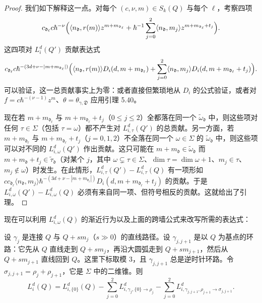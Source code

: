 \begin{proof}
我们如下解释这一点。对每个 $(c,\nu,m)\in S_k(Q)$ 与每个 $\ell$，考察四项
\[
  c_{\mathfrak d_\ell}c\hbar^{-\nu}\Bigl(\langle n_{\mathfrak d},r(m)\rangle z^{m+m_{\mathfrak d_\ell}}
  +\hbar^{-1}\sum_{j=0}^{2}\langle n_{\mathfrak d},m_j\rangle z^{m+m_{\mathfrak d_\ell}+t_j}\Bigr).
\]
这四项对 $L^d_i(Q')$ 贡献表达式
\[
  c_{\mathfrak d_\ell}c\hbar^{-(3d+\nu-|m+m_{\mathfrak d_\ell}|)}
  \Bigl(\langle n_{\mathfrak d},r(m)\rangle D_i(d,m+m_{\mathfrak d_\ell})
  +\sum_{j=0}^{2}\langle n_{\mathfrak d},m_j\rangle D_i(d,m+m_{\mathfrak d_\ell}+t_j)\Bigr).
\]
可以验证，这一总贡献事实上为零：或者直接但繁琐地从 $D_i$ 的公式验证，或者对 $f=c\hbar^{-(\nu-1)}z^m$、$\theta=\theta_{\gamma,\mathfrak D}$ 应用引理 5.40。

现在若 $m+m_{\mathfrak d_\ell}$ 与 $m+m_{\mathfrak d_\ell}+t_j$（$0\le j\le 2$）全都落在同一个 $\tilde\omega_{\mathfrak d}$ 中，则这些项对任何 $\tau\in\Sigma$（包括 $\tau=\omega$）都不产生对 $L^d_{i,\tau}(Q')$ 的总贡献。另一方面，若 $m+m_{\mathfrak d_\ell}$ 与 $m+m_{\mathfrak d_\ell}+t_j$（$j=0,1,2$）不全落在同一个 $\omega\in\Sigma$ 的 $\tilde\omega_{\mathfrak d}$ 中，则这些项可以对不同的 $L^d_{i,\omega}(Q')$ 作出贡献。这只可能在 $m+m_{\mathfrak d}\in\tilde\omega_{\mathfrak d}$ 而 $m+m_{\mathfrak d}+t_j\in\tilde\tau_{\mathfrak d}$（对某个 $j$，其中 $\omega\subsetneq\tau\in\Sigma$、$\dim\tau=\dim\omega+1$、$m_j\in\tau$、$m_j\notin\omega$）时发生。在此情形，$L^d_{i,\tau}(Q')-L^d_{i,\tau}(Q)$ 有一项形如 $cc_{\mathfrak d_\ell}\langle n_{\mathfrak d},m_j\rangle\hbar^{-(3d+\nu-|m+m_{\mathfrak d_\ell}|)}D_i(d,m+m_{\mathfrak d_\ell}+t_j)$ 的贡献。于是 $L^d_{i,\omega}(Q')-L^d_{i,\omega}(Q)$ 必须有来自同一项、但符号相反的贡献。这就给出了引理。
\end{proof}

现在可以利用 $L^d_{i,\omega}(Q)$ 的渐近行为以及上面的跨墙公式来改写所需的表达式：

\begin{lemma}
设 $\gamma_j$ 是连接 $Q$ 与 $Q+sm_j$（$s\gg0$）的直线路径。设 $\gamma_{j,j+1}$ 是以 $Q$ 为基点的环路：它先从 $Q$ 直线走到 $Q+sm_j$，再沿大圆弧走到 $Q+sm_{j+1}$，然后从 $Q+sm_{j+1}$ 直线回到 $Q$。这里下标取模 $3$，且 $\gamma_{j,j+1}$ 总是逆时针环路。令 $\sigma_{j,j+1}=\rho_j+\rho_{j+1}$，它是 $\Sigma$ 中的二维锥。则
\begin{equation}
  L^d_i(Q)=L^d_{i,\{0\}}(Q)-\sum_{j=0}^{2}L^d_{i,\gamma_j,\{0\}\to\rho_j}
  -\sum_{j=0}^{2}L^d_{i,\gamma_{j,j+1},\rho_{j+1}\to\sigma_{j,j+1}}. \tag{5.36}
\end{equation}
\end{lemma}

